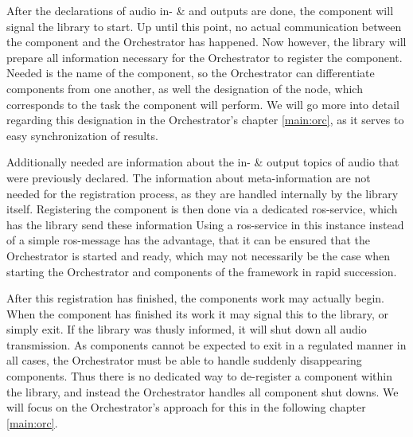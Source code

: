 After the declarations of audio in- \& and outputs are done, the component will signal the library to start.
Up until this point, no actual communication between the component and the Orchestrator has happened.
Now however, the library will prepare all information necessary for the Orchestrator to register the component.
Needed is the name of the component, so the Orchestrator can differentiate components from one another, as well the designation of the node, which corresponds to the task the component will perform.
We will go more into detail regarding this designation in the Orchestrator's chapter \ref{main:orc}, as it serves to easy synchronization of results.

Additionally needed are information about the in- \& output topics of audio that were previously declared.
The information about meta-information are not needed for the registration process, as they are handled internally by the library itself.
Registering the component is then done via a dedicated \gls{ros}-service, which has the library send these information
Using a \gls{ros}-service in this instance instead of a simple \gls{ros}-message has the advantage, that it can be ensured that the Orchestrator is started and ready, which may not necessarily be the case when starting the Orchestrator and components of the framework in rapid succession.

After this registration has finished, the components work may actually begin.
When the component has finished its work it may signal this to the library, or simply exit.
If the library was thusly informed, it will shut down all audio transmission.
As components cannot be expected to exit in a regulated manner in all cases, the Orchestrator must be able to handle suddenly disappearing components.
Thus there is no dedicated way to de-register a component within the library, and instead the Orchestrator handles all component shut downs.
We will focus on the Orchestrator's approach for this in the following chapter \ref{main:orc}.

